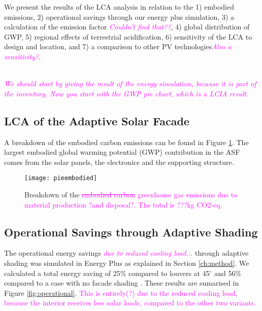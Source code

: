 
We present the results of the LCA analysis in relation to the 1) embodied emissions, 2) operational savings through our energy plus simulation, 3) a calculation of the emission factor \textcolor{magenta}{\textit{Couldn't find that??}}, 4) global distribution of GWP, 5) regional effects of terrestrial acidification, 6) sensitivity of the LCA to design and location, and 7) a comparison to other PV technologies\textcolor{magenta}{\textit{Also a sensitivity?}}.

\textcolor{magenta}{\textit{\\We should start by giving the result of the energy simulation, because it is part of the inventory. Now you start with the GWP pie chart, which is a LCIA result.}}

\subsection{LCA of the Adaptive Solar Facade}

A breakdown of the embodied carbon emissions can be found in Figure  \ref{fig:embodied}. The largest embodied global warming potential (GWP) contribution in the ASF comes from the solar panels, the electronics and the supporting structure.

\begin{figure}[H]
\begin{center}
\texttt{[image: pieembodied]}
\caption{Breakdown of the \textcolor{magenta}{\sout{embodied carbon} greenhouse gas emissions due to material production ?and disposal?. The total is  ???kg CO2-eq.}}
\label{fig:embodied}
\end{center}
\end{figure}

\subsection{Operational Savings through Adaptive Shading}
\label{ch:oppResults}

The operational energy savings \textcolor{magenta}{\textit{due to reduced cooling load...}} through adaptive shading was simulated in Energy Plus as explained in Section \ref{ch:method}. We calculated a total energy saving of 25\% compared to louvers at 45$^\circ$ and 56\% compared to a case with no facade shading \cite{jayathissa2015abs}. These results are sumarised in Figure \ref{fig:operational}. \textcolor{magenta}{This is entirely(?) due to the reduced cooling load, because the interior receives less solar loads, compared to the other two variants.}



